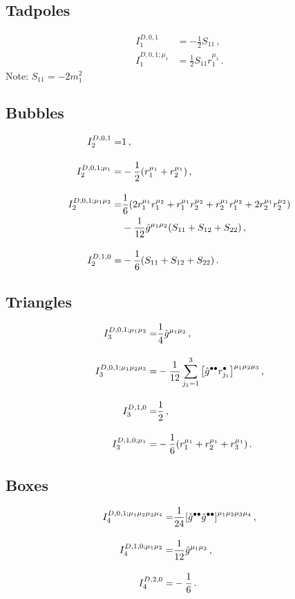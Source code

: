 \documentclass[11pt,a4paper]{refrep}
\begin{document}
\subsection*{Tadpoles}
\begin{subequations}
\begin{align}
  I_1^{D,0,1} &= -\frac{1}{2}S_{11}\,,\\[10pt]
%
  I_1^{D,0,1;\mu_1} &= \frac{1}{2}S_{11}r_1^{\mu_1}\,.
\end{align}
\end{subequations}
Note: $S_{11}=-2m_1^2$

\subsection*{Bubbles}
\begin{subequations}
\begin{align}
    I_2^{D,0,1} =& 1\,,\\[10pt]
%
    I_2^{D,0,1;\mu_1} =& -\frac{1}{2}\qty(r_1^{\mu_1}+r_2^{\mu_1})\,,\\[10pt]
%
    I_2^{D,0,1;\mu_1\mu_2} =& \frac{1}{6}\qty(2r_1^{\mu_1}r_1^{\mu_2}+r_1^{\mu_1}r_2^{\mu_2}+r_2^{\mu_1}r_1^{\mu_2}+2r_2^{\mu_1}r_2^{\mu_2})\notag\\
      &-\frac{1}{12}\hat{g}^{\mu_1\mu_2}\qty(S_{11}+S_{12}+S_{22})\,,\\[10pt]
%
    I_2^{D,1,0} =& -\frac{1}{6}\qty(S_{11}+S_{12}+S_{22})\,.
\end{align}
\end{subequations}

\subsection*{Triangles}
\begin{subequations}
\begin{align}
  I_3^{D,0,1;\mu_1\mu_2} =& \frac{1}{4}\hat{g}^{\mu_1\mu_2}\,,\\[10pt]
%
  I_3^{D,0,1;\mu_1\mu_2\mu_3} =& -\frac{1}{12}\sum_{j_1=1}^3\qty[\hat{g}^{\bullet\bullet}r_{j_1}^\bullet]^{\mu_1\mu_2\mu_3}\,,\\[10pt]
%
  I_3^{D,1,0} =& \frac{1}{2}\,,\\[10pt]
%
  I_3^{D,1,0;\mu_1} =& -\frac{1}{6}\qty(r_1^{\mu_1}+r_2^{\mu_1}+r_3^{\mu_1})\,.
\end{align}
\end{subequations}

\subsection*{Boxes}
\begin{subequations}
\begin{align}
  I_4^{D,0,1;\mu_1\mu_2\mu_3\mu_4} =& \frac{1}{24}\qty[\hat{g}^{\bullet\bullet}\hat{g}^{\bullet\bullet}]^{\mu_1\mu_2\mu_3\mu_4}\,,\\[10pt]
%
  I_4^{D,1,0;\mu_1\mu_2} =& \frac{1}{12}\hat{g}^{\mu_1\mu_2}\,,\\[10pt]
%
  I_4^{D,2,0} =& -\frac{1}{6}\,.
\end{align}
\end{subequations}
\end{document}
